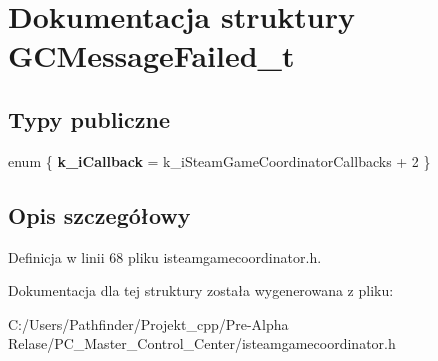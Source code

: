 \hypertarget{struct_g_c_message_failed__t}{}\section{Dokumentacja struktury G\+C\+Message\+Failed\+\_\+t}
\label{struct_g_c_message_failed__t}
\subsection*{Typy publiczne}
\begin{DoxyCompactItemize}
\item 
\mbox{\label{struct_g_c_message_failed__t_ab8b80fa6fd85b17c3dae175e60aba472}} 
enum \{ {\bfseries k\+\_\+i\+Callback} = k\+\_\+i\+Steam\+Game\+Coordinator\+Callbacks + 2
 \}
\end{DoxyCompactItemize}


\subsection{Opis szczegółowy}


Definicja w linii 68 pliku isteamgamecoordinator.\+h.



Dokumentacja dla tej struktury została wygenerowana z pliku\+:\begin{DoxyCompactItemize}
\item 
C\+:/\+Users/\+Pathfinder/\+Projekt\+\_\+cpp/\+Pre-\/\+Alpha Relase/\+P\+C\+\_\+\+Master\+\_\+\+Control\+\_\+\+Center/isteamgamecoordinator.\+h\end{DoxyCompactItemize}
